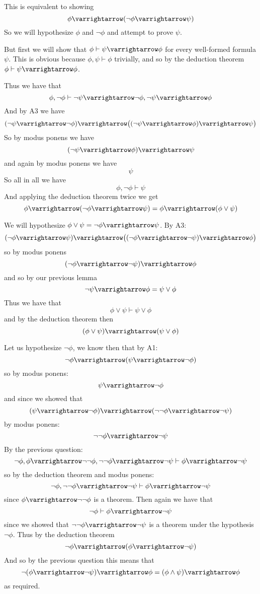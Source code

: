 \documentclass[10pt]{article}
\let\to=\varrightarrow
\begin{document}
\begin{blankpp}

    \benum
        \item This is equivalent to showing
        \[ \phi\to(\neg\phi\to\psi) \]
        So we will hypothesize $\phi$ and $\neg\phi$ and attempt to prove $\psi$.

        But first we will show that $\phi\vdash\psi\to\phi$ for every well-formed formula $\psi$.
        This is obvious because $\phi,\psi\vdash\phi$ trivially, and so by the deduction theorem $\phi\vdash\psi\to\phi$.

        Thus we have that
        \[ \phi,\neg\phi\vdash\neg\psi\to\neg\phi, \neg\psi\to\phi \]
        And by A3 we have
        \[ (\neg\psi\to\neg\phi)\to\bigl((\neg\psi\to\phi)\to\psi\bigr) \]
        So by modus ponens we have
        \[ (\neg\psi\to\phi)\to\psi \]
        and again by modus ponens we have
        \[ \psi \]
        So all in all we have
        \[ \phi,\neg\phi\vdash\psi \]
        And applying the deduction theorem twice we get
        \[ \phi\to(\neg\phi\to\psi) = \phi\to(\phi\lor\psi) \]

        \item We will hypothesize $\phi\lor\psi=\neg\phi\to\psi$.
        By A3:
        \[ (\neg\phi\to\psi)\to\bigl((\neg\phi\to\neg\psi)\to\phi\bigr) \]
        so by modus ponens
        \[ (\neg\phi\to\neg\psi)\to\phi \]
        and so by our previous lemma
        \[ \neg\psi\to\phi = \psi\lor\phi \]
        Thus we have that
        \[ \phi\lor\psi\vdash\psi\lor\phi \]
        and by the deduction theorem then
        \[ (\phi\lor\psi)\to(\psi\lor\phi) \]

        \item Let us hypothesize $\neg\phi$, we know then that by A1:
        \[ \neg\phi\to(\psi\to\neg\phi) \]
        so by modus ponens:
        \[ \psi\to\neg\phi \]
        and since we showed that
        \[ (\psi\to\neg\phi)\to(\neg\neg\phi\to\neg\psi) \]
        by modus ponens:
        \[ \neg\neg\phi\to\neg\psi \]
        By the previous question:
        \[ \neg\phi, \phi\to\neg\neg\phi, \neg\neg\phi\to\neg\psi \vdash \phi\to\neg\psi \]
        so by the deduction theorem and modus ponens:
        \[ \neg\phi, \neg\neg\phi\to\neg\psi \vdash \phi\to\neg\psi \]
        since $\phi\to\neg\neg\phi$ is a theorem.
        Then again we have that 
        \[ \neg\phi \vdash \phi\to\neg\psi \]
        since we showed that $\neg\neg\phi\to\neg\psi$ is a theorem under the hypothesis $\neg\phi$.
        Thus by the deduction theorem
        \[ \neg\phi\to(\phi\to\neg\psi) \]
        And so by the previous question this means that
        \[ \neg(\phi\to\neg\psi) \to \phi = (\phi\land\psi) \to \phi \]
        as required.


\end{blankpp}
\end{document}
